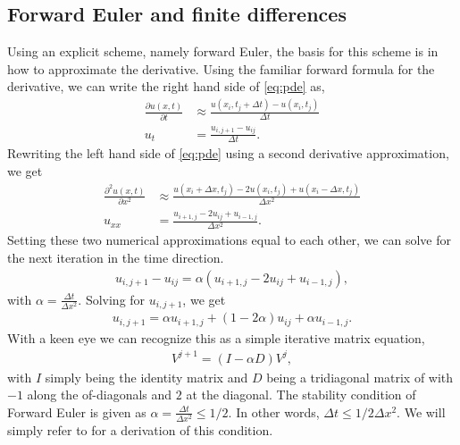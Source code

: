 \subsection{Forward Euler and finite differences}
Using an explicit scheme, namely forward Euler\citep[ch. 10.2.2]{hjorth-jensen_computational_2015}, the basis for this scheme is in how to approximate the derivative. Using the familiar forward formula for the derivative, we can write the right hand side of \eqref{eq:pde} as,
\begin{align*}
    \frac{\partial u(x,t)}{\partial t} &\approx \frac{u(x_i, t_j + \Delta t) - u(x_i, t_j)}{\Delta t} \\
    u_t &= \frac{u_{i,j+1} - u_{ij}}{\Delta t}.
\end{align*}
Rewriting the left hand side of \eqref{eq:pde} using a second derivative approximation, we get
\begin{align*}
\frac{\partial^2 u(x,t)}{\partial x^2} &\approx \frac{u(x_i+\Delta x,t_j) - 2u(x_i,t_j) + u(x_i-\Delta x, t_j)}{\Delta x^2} \\
u_{xx} &= \frac{u_{i+1,j} - 2u_{ij} + u_{i-1,j}}{\Delta x^2}.
\end{align*}
Setting these two numerical approximations equal to each other, we can solve for the next iteration in the time direction.
\begin{align*}
    u_{i,j+1} - u_{ij} = \alpha (u_{i+1,j} - 2 u_{ij} + u_{i-1,j}),
\end{align*}
with $\alpha = \frac{\Delta t}{\Delta x^2}$. Solving for $u_{i,j+1}$, we get
\begin{align}
    u_{i,j+1} = \alpha u_{i+1,j} + (1 - 2 \alpha) u_{ij} + \alpha u_{i-1,j}.
    \label{eq:explicit-forward-euler-discretized}
\end{align}
With a keen eye we can recognize this as a simple iterative matrix equation,
\begin{align}
    V^{j+1} = (I - \alpha D) V^j,
    \label{eq:fw-euler-matrix}
\end{align}
with $I$ simply being the identity matrix and $D$ being a tridiagonal matrix of with $-1$ along the of-diagonals and $2$ at the diagonal.
The stability condition of Forward Euler is given as $\alpha = \frac{\Delta t}{\Delta x^2} \leq 1/2$. In other words, $\Delta t \leq 1/2\Delta x^2$. We will simply refer to \citet[ch. 10.2.1]{hjorth-jensen_computational_2015} for a derivation of this condition.

